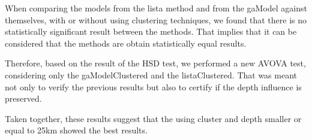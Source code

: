 When comparing the models from the lista method and from the gaModel against themselves, with or without using clustering techniques, we found that there is no statistically significant result between the methods. That implies that it can be considered that the methods are obtain statistically equal results.

Therefore, based on the result of the HSD test, we performed a new AVOVA test, considering only the gaModelClustered and the listaClustered. That was meant not only to verify the previous results but also to certify if the depth influence is preserved.

Taken together, these results suggest that the using cluster and depth smaller or equal to 25km showed the best results. 
